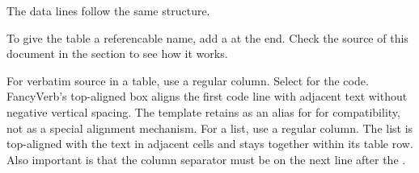 The data lines follow the same structure.
\bigbreak

To give the table a referencable name, add a
 at the end.
Check the source of this document in the section 
to see how it works.
\bigbreak

For verbatim source in a table, use a regular  column.
Select  for the code. FancyVerb's top-aligned box
aligns the first code line with adjacent text without negative vertical spacing.
The template retains  as an alias for
 for compatibility, not as a special alignment mechanism.
For a  list, use a regular
 column. The list is top-aligned with the text in adjacent
cells and stays together within its table row.
Also important is that the column separator \tsTextMonospace{\&} must be on
the next line after the .
